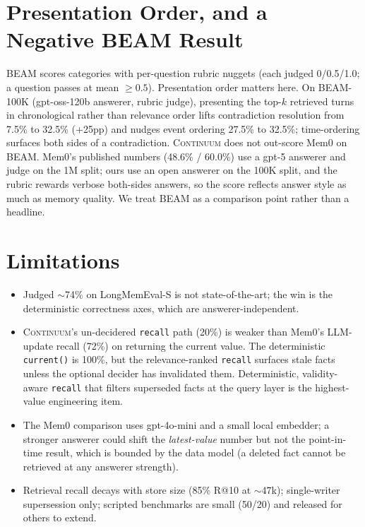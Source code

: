 \documentclass[11pt]{article}
\newcommand{\code}[1]{\texttt{#1}}
\begin{document}
\section{Presentation Order, and a Negative BEAM Result}\label{sec:beam}

BEAM scores categories with per-question rubric nuggets (each judged 0/0.5/1.0; a question passes
at mean $\ge 0.5$). Presentation order matters here. On BEAM-100K (gpt-oss-120b answerer, rubric
judge), presenting the top-$k$ retrieved turns in chronological rather than relevance order lifts
contradiction resolution from 7.5\% to 32.5\% (+25pp) and nudges event ordering 27.5\% to 32.5\%;
time-ordering surfaces both sides of a contradiction. \textsc{Continuum} does not out-score Mem0 on
BEAM. Mem0's published numbers (48.6\% / 60.0\%) use a gpt-5 answerer and judge on the 1M split;
ours use an open answerer on the 100K split, and the rubric rewards verbose both-sides answers, so
the score reflects answer style as much as memory quality. We treat BEAM as a comparison point
rather than a headline.

\section{Limitations}

\begin{itemize}[leftmargin=1.4em]
  \item Judged $\sim$74\% on LongMemEval-S is not state-of-the-art; the win is the deterministic
  correctness axes, which are answerer-independent.
  \item \textsc{Continuum}'s un-decidered \code{recall} path (20\%) is weaker than Mem0's LLM-update
  recall (72\%) on returning the current value. The deterministic \code{current()} is 100\%, but the
  relevance-ranked \code{recall} surfaces stale facts unless the optional decider has invalidated
  them. Deterministic, validity-aware \code{recall} that filters superseded facts at the query layer
  is the highest-value engineering item.
  \item The Mem0 comparison uses gpt-4o-mini and a small local embedder; a stronger answerer could
  shift the \emph{latest-value} number but not the point-in-time result, which is bounded by the
  data model (a deleted fact cannot be retrieved at any answerer strength).
  \item Retrieval recall decays with store size (85\% R@10 at $\sim$47k); single-writer
  supersession only; scripted benchmarks are small (50/20) and released for others to extend.
\end{itemize}
\end{document}
